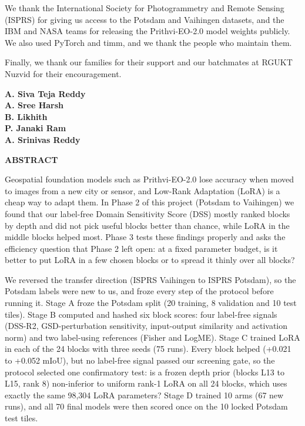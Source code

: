 \documentclass[11pt,a4paper]{report}
\newif\ifblankpage
\newcommand{\blankpage}{%
  \clearpage\blankpagetrue\thispagestyle{empty}\null\clearpage
  \blankpagefalse\addtocounter{page}{-1}}
\begin{document}
We thank the International Society for Photogrammetry and Remote Sensing (ISPRS) for giving us access to the Potsdam and Vaihingen datasets, and the IBM and NASA teams for releasing the Prithvi-EO-2.0 model weights publicly. We also used PyTorch and timm, and we thank the people who maintain them.

Finally, we thank our families for their support and our batchmates at RGUKT Nuzvid for their encouragement.

\vspace{1.5cm}
\begin{flushright}
\textbf{A. Siva Teja Reddy}\\
\textbf{A. Sree Harsh}\\
\textbf{B. Likhith}\\
\textbf{P. Janaki Ram}\\
\textbf{A. Srinivas Reddy}
\end{flushright}

\blankpage

\begin{center}
\textbf{\Large ABSTRACT}
\end{center}

\vspace{0.5cm}
Geospatial foundation models such as Prithvi-EO-2.0 lose accuracy when moved to images from a new city or sensor, and Low-Rank Adaptation (LoRA) is a cheap way to adapt them. In Phase 2 of this project (Potsdam to Vaihingen) we found that our label-free Domain Sensitivity Score (DSS) mostly ranked blocks by depth and did not pick useful blocks better than chance, while LoRA in the middle blocks helped most. Phase 3 tests these findings properly and asks the efficiency question that Phase 2 left open: at a fixed parameter budget, is it better to put LoRA in a few chosen blocks or to spread it thinly over all blocks?

We reversed the transfer direction (ISPRS Vaihingen to ISPRS Potsdam), so the Potsdam labels were new to us, and froze every step of the protocol before running it. Stage A froze the Potsdam split (20 training, 8 validation and 10 test tiles). Stage B computed and hashed six block scores: four label-free signals (DSS-R2, GSD-perturbation sensitivity, input-output similarity and activation norm) and two label-using references (Fisher and LogME). Stage C trained LoRA in each of the 24 blocks with three seeds (75 runs). Every block helped (+0.021 to +0.052 mIoU), but no label-free signal passed our screening gate, so the protocol selected one confirmatory test: is a frozen depth prior (blocks L13 to L15, rank 8) non-inferior to uniform rank-1 LoRA on all 24 blocks, which uses exactly the same 98,304 LoRA parameters? Stage D trained 10 arms (67 new runs), and all 70 final models were then scored once on the 10 locked Potsdam test tiles.
\end{document}
